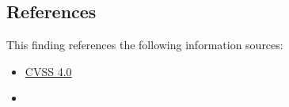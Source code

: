 
\subsection*{References}

This finding references the following information sources:

\begin{itemize}
	\item \href{https://www.first.org/cvss/calculator/3.1#CVSS:3.1/AV:L/AC:L/PR:N/UI:N/S:U/C:L/I:N/A:N}{CVSS 4.0}
	\item {}
\end{itemize}




